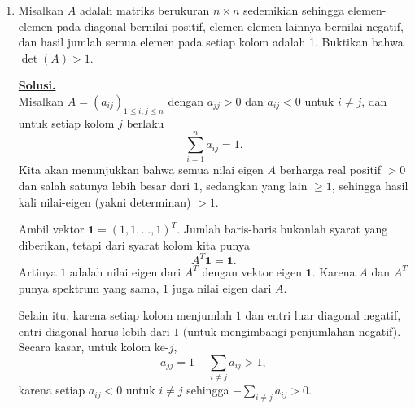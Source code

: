 \documentclass[12pt,twoside]{article}
\newenvironment{solution}
{
	\par\noindent\textbf{\underline{Solusi.}}\\
}
{
	\par
}
\begin{document}
\begin{enumerate}
\begin{solution}
          Secara definisi infimum, untuk setiap $n\in\mathbb N$ terdapat $z_n\in S$ sedemikian sehingga
          \[
            d\le |z_n-x|<d+\frac1n.
          \]
          Jadi $|z_n-x|\to d$ ketika $n\to\infty$. Artinya barisan $z_n$ berada dalam selang tertutup terbatas, misalnya di $[x-d-1, x+d+1]$ untuk $n$ cukup besar. Karena $\mathbb R$ lengkap dan selang tertutup terbatas kompak, barisan $(z_n)$ memiliki subbarisan yang konvergen. Ambil subbarisan $(z_{n_k})$ yang konvergen ke suatu $y\in\mathbb R$.

          Karena setiap $z_{n_k}\in S$ dan $S$ tertutup, limit subbarisan, yaitu $y$, juga berada di $S$.

          Sekarang gunakan kekontinuan fungsi mutlak: dari $z_{n_k}\to y$ diperoleh
          \[
            |z_{n_k}-x|\to|y-x|.
          \]
          Tetapi di sisi lain, $|z_{n_k}-x|\to d$ karena $|z_n-x|\to d$. Jadi $|y-x|=d$.

          Dengan demikian terdapat $y\in S$ yang jaraknya ke $x$ sama dengan infimum jarak ke $S$.
        \end{solution}

  \item
        Misalkan $A$ adalah matriks berukuran $n\times n$ sedemikian sehingga elemen-elemen pada diagonal bernilai positif, elemen-elemen lainnya bernilai negatif, dan hasil jumlah semua elemen pada setiap kolom adalah 1. Buktikan  bahwa $\det(A)>1$.
        \begin{solution}
          Misalkan $A=(a_{ij})_{1\le i,j\le n}$ dengan $a_{jj}>0$ dan $a_{ij}<0$ untuk $i\ne j$, dan untuk setiap kolom $j$ berlaku
          \[
            \sum_{i=1}^n a_{ij}=1.
          \]
          Kita akan menunjukkan bahwa semua nilai eigen $A$ berharga real positif $>0$ dan salah satunya lebih besar dari $1$, sedangkan yang lain $\ge1$, sehingga hasil kali nilai-eigen (yakni determinan) $>1$.

          Ambil vektor $\mathbf{1}=(1,1,\dots,1)^T$. Jumlah baris-baris bukanlah syarat yang diberikan, tetapi dari syarat kolom kita punya
          \[
            A^T\mathbf{1}=\mathbf{1}.
          \]
          Artinya $1$ adalah nilai eigen dari $A^T$ dengan vektor eigen $\mathbf1$. Karena $A$ dan $A^T$ punya spektrum yang sama, $1$ juga nilai eigen dari $A$.

          Selain itu, karena setiap kolom menjumlah $1$ dan entri luar diagonal negatif, entri diagonal harus lebih dari $1$ (untuk mengimbangi penjumlahan negatif). Secara kasar, untuk kolom ke-$j$,
          \[
            a_{jj}=1-\sum_{i\ne j}a_{ij}>1,
          \]
          karena setiap $a_{ij}<0$ untuk $i\ne j$ sehingga $-\sum_{i\ne j}a_{ij}>0$.


\end{solution}
\end{enumerate}
\end{document}
